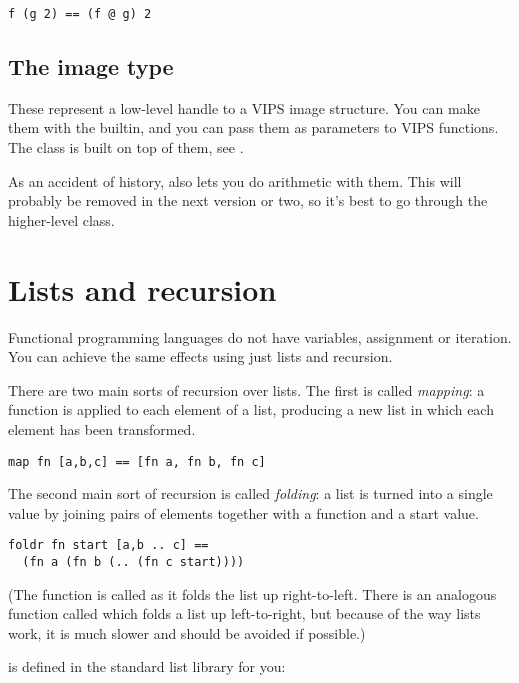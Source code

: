 \begin{verbatim}
f (g 2) == (f @ g) 2
\end{verbatim}

\subsection{The image type}

These represent a low-level handle to a VIPS image structure. You can make
them with the  builtin, and you can pass them as parameters to
VIPS functions. The  class is built on top of them,
see .

As an accident of history, \nip{} also lets you do arithmetic with them. This
will probably be removed in the next version or two, so it's best to go
through the higher-level  class.

\section{Lists and recursion}

Functional programming languages do not have variables, assignment or
iteration. You can achieve the same effects using just lists and recursion.

There are two main sorts of recursion over lists. The first is called 
\emph{mapping}: a function is applied to each element of a list, producing
a new list in which each element has been transformed.

\begin{verbatim}
map fn [a,b,c] == [fn a, fn b, fn c]
\end{verbatim}

The second main sort of recursion is called \emph{folding}: a list is turned
into a single value by joining pairs of elements together with a function and
a start value.

\begin{verbatim}
foldr fn start [a,b .. c] == 
  (fn a (fn b (.. (fn c start))))
\end{verbatim}

\noindent
(The function is called  as it folds the list up right-to-left.
There is an analogous function called  which folds a list up
left-to-right, but because of the way lists work, it is much slower and should
be avoided if possible.)

 is defined in the standard list library for you:


